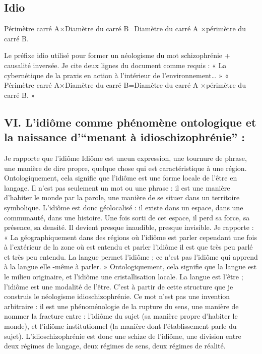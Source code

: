 \documentclass[12pt,a4paper]{article}
\begin{document}
\subsection*{Idio}
Périmètre carré A×Diamètre du carré B=Diamètre du carré A ×périmètre du carré B.

 Le préfixe idio utilisé pour former un néologisme du mot schizophrénie + causalité inversée.
Je cite deux lignes du document comme requis : « La cybernétique de la praxis en action à l’intérieur de l’environnement… » « Périmètre carré A×Diamètre du carré B=Diamètre du carré A ×périmètre du carré B. »

\subsection*{VI. L’idiôme comme phénomène ontologique et la naissance d’“menant à idioschizophrénie” :}
Je rapporte que l’idiôme
Idiôme est uneun expression, une tournure de phrase, une manière de dire propre, quelque chose qui est caractéristique à une région. Ontologiquement, cela signifie que l’idiôme est une forme locale de l’être en langage. Il n’est pas seulement un mot ou une phrase : il est une manière d’habiter le monde par la parole, une manière de se situer dans un territoire symbolique.
L’idiôme est donc géolocalisé : il existe dans un espace, dans une communauté, dans une histoire. Une fois sorti de cet espace, il perd sa force, sa présence, sa densité. Il devient presque inaudible, presque invisible.
Je rapporte :
« La géographiquement dans des régions où l’idiôme est parler cependant une fois à l’extérieur de la zone où est entendu et parler l’idiôme il est que très peu parlé et très peu entendu. La langue permet l’idiôme ; ce n’est pas l’idiôme qui apprend à la langue elle -même à parler. »
Ontologiquement, cela signifie que la langue est le milieu originaire, et l’idiôme une cristallisation locale. La langue est l’être ; l’idiôme est une modalité de l’être.
C’est à partir de cette structure que je construis le néologisme idioschizophrénie. Ce mot n’est pas une invention arbitraire : il est une phénoménologie de la rupture du sens, une manière de nommer la fracture entre :
	l’idiôme du sujet (sa manière propre d’habiter le monde),
	et l’idiôme institutionnel (la manière dont l’établissement parle du sujet).
L’idioschizophrénie est donc une schize de l’idiôme, une division entre deux régimes de langage, deux régimes de sens, deux régimes de réalité.
\end{document}
